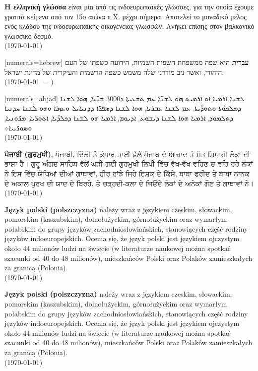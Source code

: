 \documentclass[a4paper]{article}
\begin{document}
\begin{greek}
\textbf{Η ελληνική γλώσσα} είναι μία από τις ινδοευρωπαϊκές γλώσσες, για την
οποία έχουμε γραπτά κείμενα από τον 15ο αιώνα π.Χ. μέχρι σήμερα. Αποτελεί το
μοναδικό μέλος ενός κλάδου της ινδοευρωπαϊκής οικογένειας γλωσσών. Ανήκει
επίσης στον βαλκανικό γλωσσικό δεσμό.\\	
(\today) 
\end{greek}


\begin{hebrew}[numerals=hebrew]
\textbf{עברית} היא שפה ממשפחת השפות השמיות, הידועה כשפתו של העם היהודי, ואשר ניב מודרני שלה משמש כשפה הרשמית והעיקרית של מדינת ישראל. \\
(\today\ = \hebrewtoday)
\end{hebrew}

\begin{syriac}[numerals=abjad]
ܠܫܢܐ ܐܪܡܝܐ ܐܘ ܐܪܡܝܬ ܗܘ ܠܫܢ̈ܐ ܥܡ ܬܫܥܝܬܐ ܕ\textrm{3000} ܫܢ̈ܝܐ܂ ܗܘܐ ܠܫܢܐ ܕܡܠܟܘ̈ܬܐ ܘܬܘܕ̈ܝܬܐ܂ ܥܡ ܠܫܢܐ ܥܒܪܝܐ܄ ܗܘܐ ܠܫܢܐ ܕܣܦܪ̈ܐ ܕܕܢܝܐܝܠ ܘܥܙܪܐ ܘܗܘ ܠܫܢܐ ܚܕܢܝܐ ܕܬܠܡܘܕ܂ ܐܪܡܝܐ ܗܘܐ ܠܫܢܐ ܕܝܫܘܥ܂ ܐܕܝܘܡ܄ ܐܪܡܝܐ ܗܘ ܠܫܢܐ ܕܟܠܕ̈ܝܐ܄ ܐܬܘܪ̈ܝܐ܄ ܡܪ̈ܘܢܝܐ܄ ܘܣܘܪ̈ܝܝܐ܀ \\
(\today)
\end{syriac}

\begin{panjabi}
\textbf{ਪੰਜਾਬੀ (ਗੁਰਮੁਖੀ)}, ਪੰਜਾਬੀ, ਦਿੱਲੀ ਤੋਂ ਕੰਧਾਰ ਤਾਈਂ ਫੈਲੇ ਪੰਜਾਬ ਦੇ ਆਜ਼ਾਦ ਤੇ ਸੰਤ-ਸਿਪਾਹੀ ਲੋਕਾਂ ਦੀ ਭਾਸ਼ਾ ਹੈ। ਗੁਰੂ ਅੰਗਦ ਸਾਹਿਬ ਵੱਲੋਂ ਘੜੀ ਗਈ ਗੁਰਮੁਖੀ ਲਿਪੀ ਵਿੱਚ ਵੱਖ-ਵੱਖ ਵਹਿਣ ਚ ਵਹਿ ਰਹੇ ਲੋਕਾਂ ਨੇ ਇਸ ਵਿੱਚ ਯੋਧਿਆਂ ਦੀਆਂ ਗਾਥਾਵਾਂ, ਹੀਰ ਰਾਂਝੇ ਜਿਹੇ ਇਸ਼ਕ ਦੇ ਕਿੱਸੇ, ਬਾਬਾ ਫਰੀਦ ਤੇ ਬਾਬਾ ਨਾਨਕ ਦੇ ਅਕਾਲ ਪੁਰਖ ਦੀ ਯਾਦ ਦੇ ਬਿਰਹੇ, ਤੇ ਚੜ੍ਹਦੀ-ਕਲਾ ਦੇ ਜਿਓਂਦੇ ਲੋਕਾਂ ਦੇ ਅਨੇਕਾਂ ਗੌਣ ਤੇ ਗਾਥਾਵਾਂ ਨੇ।  \\
(\today)
\end{panjabi}

\begin{polish}
\textbf{Język polski (polszczyzna)} należy wraz z językiem czeskim, słowackim, pomorskim (kaszubskim), dolnołużyckim, górnołużyckim oraz wymarłym połabskim do grupy języków zachodniosłowiańskich, stanowiących część rodziny języków indoeuropejskich. Ocenia się, że język polski jest językiem ojczystym około 44 milionów ludzi na świecie (w literaturze naukowej można spotkać szacunki od 40 do 48 milionów), mieszkańców Polski oraz Polaków zamieszkałych za granicą (Polonia).\\
(\today)
\end{polish}

\begin{polish}
\textbf{Język polski (polszczyzna)} należy wraz z językiem czeskim, słowackim, pomorskim (kaszubskim), dolnołużyckim, górnołużyckim oraz wymarłym połabskim do grupy języków zachodniosłowiańskich, stanowiących część rodziny języków indoeuropejskich. Ocenia się, że język polski jest językiem ojczystym około 44 milionów ludzi na świecie (w literaturze naukowej można spotkać szacunki od 40 do 48 milionów), mieszkańców Polski oraz Polaków zamieszkałych za granicą (Polonia).\\
(\today)
\end{polish}
\end{document}
